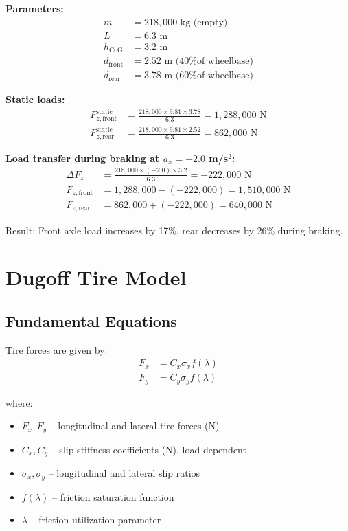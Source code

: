\documentclass[11pt,a4paper]{article}
\begin{document}
\textbf{Parameters:}
\begin{align}
m &= 218{,}000 \text{ kg (empty)} \\
L &= 6.3 \text{ m} \\
h_{\text{CoG}} &= 3.2 \text{ m} \\
d_{\text{front}} &= 2.52 \text{ m (40\% of wheelbase)} \\
d_{\text{rear}} &= 3.78 \text{ m (60\% of wheelbase)}
\end{align}

\textbf{Static loads:}
\begin{align}
F_{z,\text{front}}^{\text{static}} &= \frac{218{,}000 \times 9.81 \times 3.78}{6.3} = 1{,}288{,}000 \text{ N} \\
F_{z,\text{rear}}^{\text{static}} &= \frac{218{,}000 \times 9.81 \times 2.52}{6.3} = 862{,}000 \text{ N}
\end{align}

\textbf{Load transfer during braking at $a_x = -2.0$ m/s$^2$:}
\begin{align}
\Delta F_z &= \frac{218{,}000 \times (-2.0) \times 3.2}{6.3} = -222{,}000 \text{ N} \\
F_{z,\text{front}} &= 1{,}288{,}000 - (-222{,}000) = 1{,}510{,}000 \text{ N} \\
F_{z,\text{rear}} &= 862{,}000 + (-222{,}000) = 640{,}000 \text{ N}
\end{align}

Result: Front axle load increases by 17\%, rear decreases by 26\% during braking.

\section{Dugoff Tire Model}

\subsection{Fundamental Equations}

Tire forces are given by:
\begin{align}
F_x &= C_x \sigma_x f(\lambda) \label{eq:Fx_dugoff}\\
F_y &= C_y \sigma_y f(\lambda) \label{eq:Fy_dugoff}
\end{align}

where:
\begin{itemize}
    \item $F_x, F_y$ -- longitudinal and lateral tire forces (N)
    \item $C_x, C_y$ -- slip stiffness coefficients (N), load-dependent
    \item $\sigma_x, \sigma_y$ -- longitudinal and lateral slip ratios
    \item $f(\lambda)$ -- friction saturation function
    \item $\lambda$ -- friction utilization parameter
\end{itemize}
\end{document}

